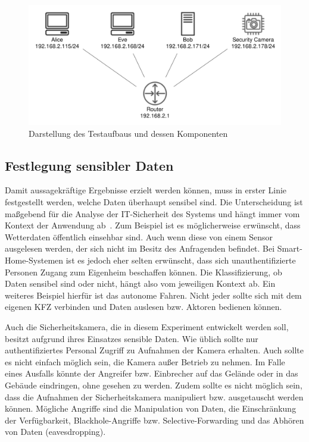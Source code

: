 \begin{figure}[htbp]
  \centerline{\includegraphics[width=\columnwidth]{images/testing-setup}}
  \caption{Darstellung des Testaufbaus und dessen Komponenten}
  \label{fig:testing-setup}
\end{figure}

\subsection{Festlegung sensibler Daten}
Damit aussagekräftige Ergebnisse erzielt werden können, muss in erster Linie
festgestellt werden, welche Daten überhaupt sensibel sind. Die Unterscheidung
ist maßgebend für die Analyse der IT-Sicherheit des Systems und hängt immer vom
Kontext der Anwendung ab~\cite{paper}. Zum Beispiel ist es möglicherweise
erwünscht, dass Wetterdaten öffentlich einsehbar sind. Auch wenn diese
von einem Sensor ausgelesen werden, der sich nicht im Besitz des Anfragenden
befindet. Bei Smart-Home-Systemen ist es jedoch eher selten erwünscht, dass sich
unauthentifizierte Personen Zugang zum Eigenheim beschaffen können. Die
Klassifizierung, ob Daten sensibel sind oder nicht, hängt also vom jeweiligen
Kontext ab. Ein weiteres Beispiel hierfür ist das autonome Fahren. Nicht jeder
sollte sich mit dem eigenen KFZ verbinden und Daten auslesen bzw. Aktoren
bedienen können.

Auch die Sicherheitskamera, die in diesem Experiment entwickelt werden soll,
besitzt aufgrund ihres Einsatzes sensible Daten. Wie üblich sollte nur
authentifiziertes Personal Zugriff zu Aufnahmen der Kamera erhalten. Auch sollte
es nicht einfach möglich sein, die Kamera außer Betrieb zu nehmen. Im Falle
eines Ausfalls könnte der Angreifer bzw. Einbrecher auf das Gelände oder in das
Gebäude eindringen, ohne gesehen zu werden. Zudem sollte es nicht möglich sein,
dass die Aufnahmen der Sicherheitskamera manipuliert bzw. ausgetauscht werden
können. Mögliche Angriffe sind die Manipulation von Daten, die Einschränkung
der Verfügbarkeit, Blackhole-Angriffe bzw. Selective-Forwarding und das Abhören
von Daten (eavesdropping).
